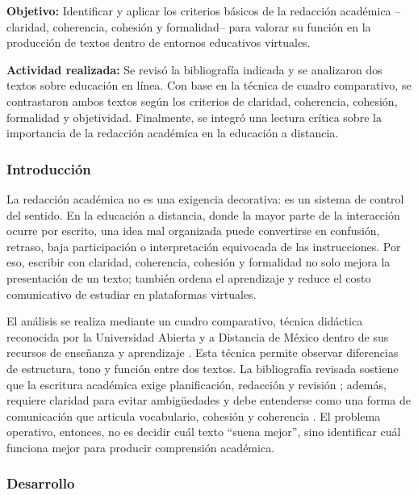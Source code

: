 \begin{portafolioabstract}
	\textbf{Objetivo:} Identificar y aplicar los criterios básicos de la redacción académica --claridad, coherencia, cohesión y formalidad-- para valorar su función en la producción de textos dentro de entornos educativos virtuales.

	\textbf{Actividad realizada:} Se revisó la bibliografía indicada y se analizaron dos textos sobre educación en línea. Con base en la técnica de cuadro comparativo, se contrastaron ambos textos según los criterios de claridad, coherencia, cohesión, formalidad y objetividad. Finalmente, se integró una lectura crítica sobre la importancia de la redacción académica en la educación a distancia.
\end{portafolioabstract}

\subsubsection{Introducción}

La redacción académica no es una exigencia decorativa: es un sistema de control del sentido. En la educación a distancia, donde la mayor parte de la interacción ocurre por escrito, una idea mal organizada puede convertirse en confusión, retraso, baja participación o interpretación equivocada de las instrucciones. Por eso, escribir con claridad, coherencia, cohesión y formalidad no solo mejora la presentación de un texto; también ordena el aprendizaje y reduce el costo comunicativo de estudiar en plataformas virtuales.

El análisis se realiza mediante un cuadro comparativo, técnica didáctica reconocida por la Universidad Abierta y a Distancia de México dentro de sus recursos de enseñanza y aprendizaje \citep{unadm100TecnicasDidacticas2023}. Esta técnica permite observar diferencias de estructura, tono y función entre dos textos. La bibliografía revisada sostiene que la escritura académica exige planificación, redacción y revisión \citep{nunezcortesEscrituraAcademicaTeoria2015}; además, requiere claridad para evitar ambigüedades \citep{ayalaTallerLecturaRedaccion2010} y debe entenderse como una forma de comunicación que articula vocabulario, cohesión y coherencia \citep{vitoriaEscrituraAcademicaFormacion2019}. El problema operativo, entonces, no es decidir cuál texto ``suena mejor'', sino identificar cuál funciona mejor para producir comprensión académica.

\subsubsection{Desarrollo}

